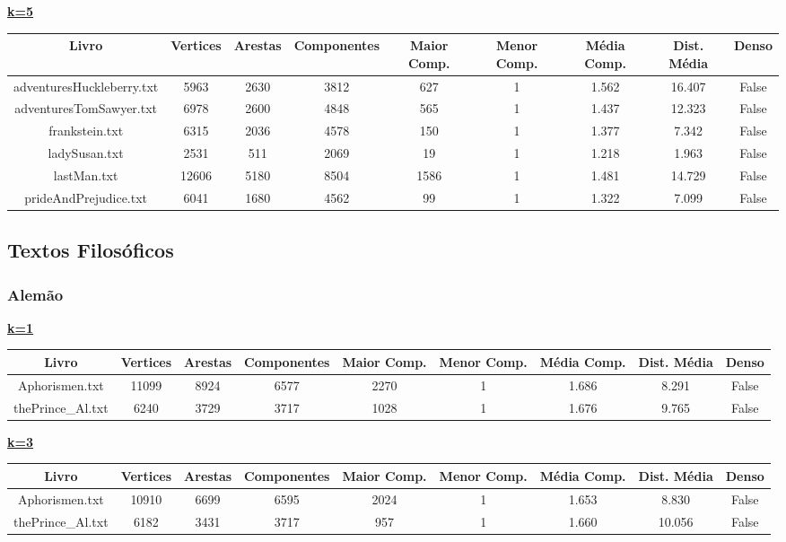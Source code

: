 \documentclass[12pt]{article}
\newcommand{\mytitle}[1]{\textbf{\underline{#1}}}
\begin{document}
\noindent\mytitle{k=5}
\begin{center}
\begin{tabular}{||c | c | c | c | c | c | c | c | c||}
\hline
Livro & Vertices & Arestas & Componentes & Maior Comp. & Menor Comp. & Média Comp. & Dist. Média & Denso \\ [0.5ex]
\hline\hline
adventuresHuckleberry.txt & 5963 & 2630 & 3812 & 627 & 1 & 1.562 & 16.407 & False \\
\hline
adventuresTomSawyer.txt & 6978 & 2600 & 4848 & 565 & 1 & 1.437 & 12.323 & False \\
\hline
frankstein.txt & 6315 & 2036 & 4578 & 150 & 1 & 1.377 & 7.342 & False \\
\hline
ladySusan.txt & 2531 & 511 & 2069 & 19 & 1 & 1.218 & 1.963 & False \\
\hline
lastMan.txt & 12606 & 5180 & 8504 & 1586 & 1 & 1.481 & 14.729 & False \\
\hline
prideAndPrejudice.txt & 6041 & 1680 & 4562 & 99 & 1 & 1.322 & 7.099 & False \\
\hline
\end{tabular}
\end{center}


\subsection{Textos Filosóficos}

\subsubsection{Alemão}

\noindent\mytitle{k=1}
\begin{center}
\begin{tabular}{||c | c | c | c | c | c | c | c | c||}
\hline
Livro & Vertices & Arestas & Componentes & Maior Comp. & Menor Comp. & Média Comp. & Dist. Média & Denso \\ [0.5ex]
\hline\hline
Aphorismen.txt & 11099 & 8924 & 6577 & 2270 & 1 & 1.686 & 8.291 & False \\
\hline
thePrince\_Al.txt & 6240 & 3729 & 3717 & 1028 & 1 & 1.676 & 9.765 & False \\
\hline
\end{tabular}
\end{center}

\noindent\mytitle{k=3}
\begin{center}
\begin{tabular}{||c | c | c | c | c | c | c | c | c||}
\hline
Livro & Vertices & Arestas & Componentes & Maior Comp. & Menor Comp. & Média Comp. & Dist. Média & Denso \\ [0.5ex]
\hline\hline
Aphorismen.txt & 10910 & 6699 & 6595 & 2024 & 1 & 1.653 & 8.830 & False \\
\hline
thePrince\_Al.txt & 6182 & 3431 & 3717 & 957 & 1 & 1.660 & 10.056 & False \\
\hline
\end{tabular}
\end{center}
\end{document}
